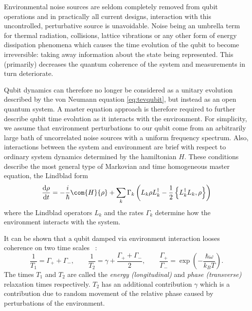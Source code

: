 Environmental noise sources are seldom completely removed from qubit operations and in practically all current designs, interaction with this uncontrolled, perturbative source is unavoidable.
Noise being an umbrella term for thermal radiation, collisions, lattice vibrations or any other form of energy dissipation phenomena which causes the time evolution of the qubit to become irreversible: taking away information about the state being represented.
This (primarily) decreases the quantum coherence of the system and measurements in turn deteriorate.

Qubit dynamics can therefore no longer be considered as a unitary evolution described by the von Neumann equation \cref{eq:tevqubit}, but instead as an open quantum system.
A master equation approach is therefore required to further describe qubit time evolution as it interacts with the environment.
For simplicity, we assume that environment perturbations to our qubit come from an arbitrarily large bath of uncorrelated noise sources with a uniform frequency spectrum.
Also, interactions between the system and environment are brief with respect to ordinary system dynamics determined by the hamiltonian $H$.
These conditions describe the most general type of Markovian and time homogeneous master equation, the Lindblad form~\cite{Lindblad1976}
\begin{equation}
\frac{\mathrm{d}\rho}{\mathrm{d}t} =-\frac{i}{\hbar}\com{H}{\rho}+\sum_{k} \Gamma_k\left(L_k\rho L_k^\dagger-\frac{1}{2}\left\{L_k^\dagger L_k, \rho\right\}\right)
\label{eq:lindblad}
\end{equation}
where the Lindblad operators $L_k$ and the rates $\Gamma_k$ determine
how the environment interacts with the system.

It can be shown that a qubit damped via environment interaction looses coherence on two time scales ~\cite{Stenholm2005}:
\begin{equation}
\frac{1}{T_1} = \Gamma_+ + \Gamma_-, \qquad \frac{1}{T_2} = \gamma + \frac{\Gamma_+ + \Gamma_-}{2}, \qquad \frac{\Gamma_+}{\Gamma_-} = \exp\left(-\frac{\hbar \omega}{k_B T}\right).
\label{eq:t1t2}
\end{equation}
The times $T_1$ and $T_2$ are called the \textit{energy (longitudinal)} and \textit{phase (transverse)} relaxation times respectively.
$T_2$ has an additional contribution $\gamma$ which is a contribution due to random movement of the relative phase caused by perturbations of the environment.

